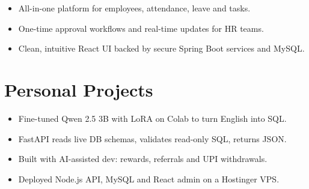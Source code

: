 \documentclass[11pt]{deedy-resume-openfont}
\renewcommand{\sectionsep}{\vspace{9pt}}
\begin{document}
\begin{minipage}[t]{0.66\textwidth}
\begin{itemize}
  \item All-in-one platform for employees, attendance, leave and tasks.
  \item One-time approval workflows and real-time updates for HR teams.
  \item Clean, intuitive React UI backed by secure Spring Boot services and MySQL.
\end{itemize}
\sectionsep


\section{Personal Projects}
\begin{itemize}
  \item Fine-tuned Qwen 2.5 3B with LoRA on Colab to turn English into SQL.
  \item FastAPI reads live DB schemas, validates read-only SQL, returns JSON.
\end{itemize}
\sectionsep

\begin{itemize}
  \item Built with AI-assisted dev: rewards, referrals and UPI withdrawals.
  \item Deployed Node.js API, MySQL and React admin on a Hostinger VPS.
\end{itemize}
\sectionsep

\end{minipage}
\end{document}
